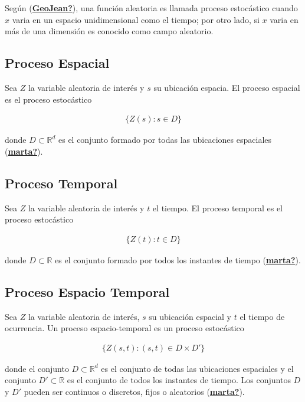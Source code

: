 \documentclass[
]{book}
\begin{document}
Según (\protect\hyperlink{ref-GeoJean}{\textbf{GeoJean?}}), una función aleatoria es llamada proceso estocástico cuando \(x\) varia en un espacio unidimensional como el tiempo; por otro lado, si \(x\) varia en más de una dimensión es conocido como campo aleatorio.

\hypertarget{proceso-espacial}{%
\subsection{Proceso Espacial}\label{proceso-espacial}}

Sea \(Z\) la variable aleatoria de interés y \(s\) su ubicación espacia. El proceso espacial es el proceso estocástico

\begin{align}
\{Z(s):s \in D\}
\end{align}

donde \(D \subset \mathbb{R}^d\) es el conjunto formado por todas las ubicaciones espaciales (\protect\hyperlink{ref-marta}{\textbf{marta?}}).

\hypertarget{proceso-temporal}{%
\subsection{Proceso Temporal}\label{proceso-temporal}}

Sea \(Z\) la variable aleatoria de interés y \(t\) el tiempo. El proceso temporal es el proceso estocástico

\begin{align}
\{Z(t):t \in D\}
\end{align}

donde \(D \subset \mathbb{R}\) es el conjunto formado por todos los instantes de tiempo (\protect\hyperlink{ref-marta}{\textbf{marta?}}).

\hypertarget{proceso-espacio-temporal}{%
\subsection{Proceso Espacio Temporal}\label{proceso-espacio-temporal}}

Sea \(Z\) la variable aleatoria de interés, \(s\) su ubicación espacial y \(t\) el tiempo de ocurrencia. Un proceso espacio-temporal es un proceso estocástico

\begin{align}
\{Z(s,t):(s,t) \in D \times D' \}
\end{align}

donde el conjunto \(D \subset \mathbb{R}^d\) es el conjunto de todas las ubicaciones espaciales y el conjunto \(D' \subset \mathbb{R}\) es el conjunto de todos los instantes de tiempo. Los conjuntos \(D\) y \(D'\) pueden ser continuos o discretos, fijos o aleatorios (\protect\hyperlink{ref-marta}{\textbf{marta?}}).
\end{document}
